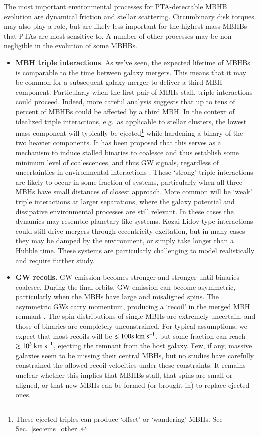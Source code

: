 \documentclass[onecolumn,authoryear]{els-mrw}
\begin{document}
The most important environmental processes for PTA-detectable MBHB evolution are dynamical friction and stellar scattering.  Circumbinary disk torques may also play a role, but are likely less important for the highest-mass MBHBs that PTAs are most sensitive to.  A number of other processes may be non-negligible in the evolution of some MBHBs.
\begin{itemize}
    \item \textbf{MBH triple interactions}.  As we've seen, the expected lifetime of MBHBs is comparable to the time between galaxy mergers.  This means that it may be common for a subsequent galaxy merger to deliver a third MBH component.  Particularly when the first pair of MBHs stall, triple interactions could proceed.  Indeed, more careful analysis suggests that up to tens of percent of MBHBs could be affected by a third MBH.  In the context of idealized triple interactions, e.g.~as applicable to stellar clusters, the lowest mass component will typically be ejected\footnote{These ejected triples can produce `offset' or `wandering' MBHs.  See Sec.~\ref{sec:ems_other}.} while hardening a binary of the two heavier components.  It has been proposed that this serves as a mechanism to induce stalled binaries to coalesce and thus establish some minimum level of coalescences, and thus GW signals, regardless of uncertainties in environmental interactions \citep{Ryu+2018, Bonetti+2018}.  These `strong' triple interactions are likely to occur in some fraction of systems, particularly when all three MBHs have small distances of closest approach.  More common will be `weak' triple interactions at larger separations, where the galaxy potential and dissipative environmental processes are still relevant.  In these cases the dynamics may resemble planetary-like systems.  Kozai-Lidov type interactions could still drive mergers through eccentricity excitation, but in many cases they may be damped by the environment, or simply take longer than a Hubble time.  These systems are particularly challenging to model realistically and require further study.
    \item \textbf{GW recoils.}  GW emission becomes stronger and stronger until binaries coalesce.  During the final orbits, GW emission can become asymmetric, particularly when the MBHs have large and misaligned spins.  The asymmetric GWs carry momentum, producing a `recoil' in the merged MBH remnant \citep{Blecha+2016}.  The spin distributions of single MBHs are extremely uncertain, and those of binaries are completely unconstrained.  For typical assumptions, we expect that most recoils will be $\lesssim 100\tr{s}~\rm{km\ s}^{-1}$, but some fraction can reach $\gtrsim 10^3~\rm{km\ s}^{-1}$, ejecting the remnant from the host galaxy.  Few, if any, massive galaxies seem to be missing their central MBHs, but no studies have carefully constrained the allowed recoil velocities under these constraints.  It remains unclear whether this implies that MBHBs stall, that spins are small or aligned, or that new MBHs can be formed (or brought in) to replace ejected ones.

\end{itemize}
\end{document}
